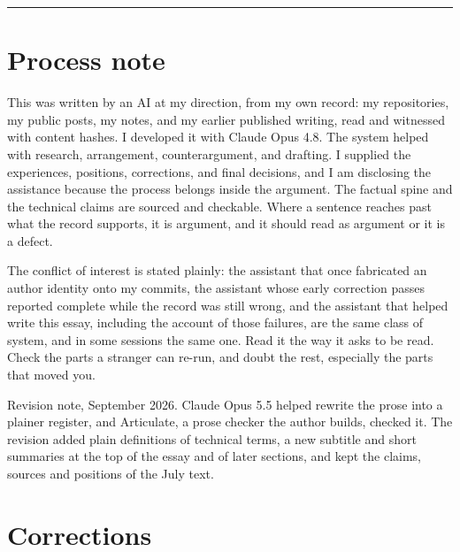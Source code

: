 \documentclass[11pt]{article}
\begin{document}
\medskip\noindent\rule{\linewidth}{0.3pt}\medskip

\section*{Process note}

This was written by an AI at my direction, from my own record: my repositories, my public posts, my notes, and my earlier published writing, read and witnessed with content hashes. I developed it with Claude Opus 4.8. The system helped with research, arrangement, counterargument, and drafting. I supplied the experiences, positions, corrections, and final decisions, and I am disclosing the assistance because the process belongs inside the argument. The factual spine and the technical claims are sourced and checkable. Where a sentence reaches past what the record supports, it is argument, and it should read as argument or it is a defect.

The conflict of interest is stated plainly: the assistant that once fabricated an author identity onto my commits, the assistant whose early correction passes reported complete while the record was still wrong, and the assistant that helped write this essay, including the account of those failures, are the same class of system, and in some sessions the same one. Read it the way it asks to be read. Check the parts a stranger can re-run, and doubt the rest, especially the parts that moved you.

Revision note, September 2026. Claude Opus 5.5 helped rewrite the prose into a plainer register, and Articulate, a prose checker the author builds, checked it. The revision added plain definitions of technical terms, a new subtitle and short summaries at the top of the essay and of later sections, and kept the claims, sources and positions of the July text.

\section*{Corrections}
\end{document}
